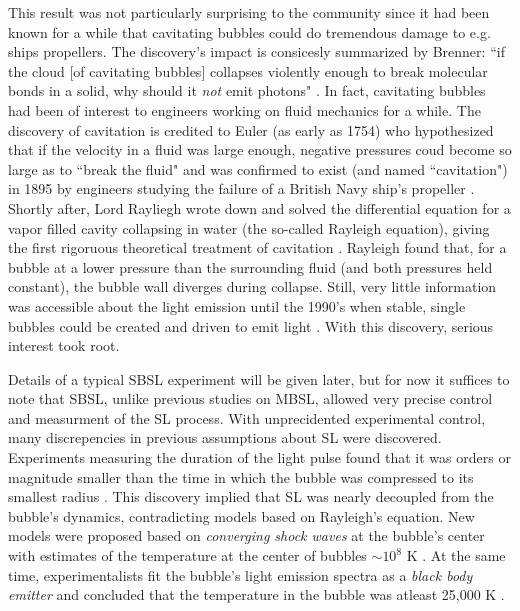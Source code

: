 \documentclass[rmp,aps,nofootinbib,superscriptaddress,floatfix]{revtex4-2}
\begin{document}
This result was not particularly surprising to the community since it had been known for a while that cavitating bubbles could do tremendous damage to e.g. ships propellers. The discovery's impact is consicesly summarized by Brenner: ``if the cloud [of cavitating bubbles] collapses violently enough to break molecular bonds in a solid, why should it \emph{not} emit photons" \cite{brenner2002single}. In fact, cavitating bubbles had been of interest to engineers working on fluid mechanics for a while. The discovery of cavitation is credited to Euler (as early as 1754) who hypothesized that if the velocity in a fluid was large enough, negative pressures coud become so large as to ``break the fluid" \cite{li2015introduction,gaitan1992sonoluminescence} and was confirmed to exist (and named ``cavitation") in 1895 by engineers studying the failure of a British Navy ship's propeller \cite{li2015introduction}. Shortly after, Lord Rayliegh wrote down and solved the differential equation for a vapor filled cavity collapsing in water (the so-called Rayleigh equation), giving the first rigoruous theoretical treatment of cavitation \cite{rayleigh1917pressure}. Rayleigh found that, for a bubble at a lower pressure than the surrounding fluid (and both pressures held constant), the bubble wall diverges during collapse. Still, very little information was accessible about the light emission until the 1990's when stable, single bubbles could be created and driven to emit light \cite{gaitan1990experimental,gaitan1992sonoluminescence,crum1994sonoluminescence}. With this discovery, serious interest took root. 

Details of a typical SBSL experiment will be given later, but for now it suffices to note that SBSL, unlike previous studies on MBSL, allowed very precise control and measurment of the SL process. With unprecidented experimental control, many discrepencies in previous assumptions about SL were discovered. Experiments measuring the duration of the light pulse found that it was orders or magnitude smaller than the time in which the bubble was compressed to its smallest radius \cite{barber1992resolving,barber1991observation}. This discovery implied that SL was nearly decoupled from the bubble's dynamics, contradicting models based on Rayleigh's equation. New models were proposed based on \emph{converging shock waves} at the bubble's center with estimates of the temperature at the center of bubbles $\sim10^8$ K \cite{wu1993shock,greenspan1993sonoluminescence}. At the same time, experimentalists fit the bubble's light emission spectra as a \emph{black body emitter} and concluded that the temperature in the bubble was atleast 25,000 K \cite{hiller1992spectrum}.
\end{document}
